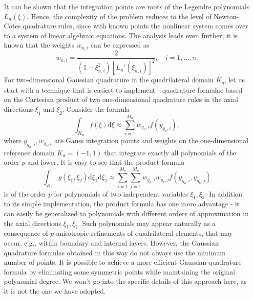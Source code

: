 \documentclass{develop-note}
\begin{document}
It can be shown that the integration points are roots of the Legendre polynomials $L_{n}(\xi)$. Hence, the complexity of the problem reduces to the level of Newton-Cotes quadrature rules, since with known points the nonlinear system comes over to a system of linear algebraic equations. The analysis leads even further; it is known that the weights $w_{n,i}$ can be expressed as
\begin{equation}
  w_{n,i}=\dfrac{2}{(1-\xi_{n,i}^{2})[L_{n}'(\xi_{n,i})]^{2}}, \quad i=1,\dots,n.
\end{equation}
For two-dimensional Gaussian quadrature in the quadrilateral domain $K_{q}$, let us start with a technique that is easiest to implement - quadrature formulae based on the Cartesian product of two one-dimensional quadrature rules in the axial directions $\xi_{1}$ and $\xi_{2}$. Consider the formula
\begin{equation}
  \int_{K_{a}}f(\xi)\mathrm{d}\xi\approx\sum_{i=1}^{M_{a}}w_{g_{a},i}f(y_{g_{a},i}),
\end{equation}
where $y_{g_{a},i},w_{g_{a},i}$ are Gauss integration points and weights on the one-dimensional reference domain $K_{a}=(-1,1)$ that integrate exactly all polynomials of the order $p$ and lower. It is easy to see that the product formula
\begin{equation}
  \int_{K_{a}}g(\xi_{1},\xi_{2})\mathrm{d}\xi_{1}\mathrm{d}\xi_{2}\approx\sum_{i=1}^{M_{a}}\sum_{j=1}^{M_{a}}w_{g_{a},i}w_{g_{b},j}f(y_{g_{a},i},y_{g_{b},j})
\end{equation}
is of the order $p$ for polynomials of two independent variables $\xi_{1},\xi_{2}$. In addition to its simple implementation, the product formula has one more advantage - it can easily be generalized to polynomials with different orders of approximation in the axial directions $\xi_{1},\xi_{2}$. Such polynomials may appear naturally as a consequence of $p$-anisotropic refinements of quadrilateral elements, that may occur, e.g., within boundary and internal layers. However, the Gaussian quadrature formulas obtained in this way do not always use the minimum number of points. It is possible to achieve a more efficient Gaussian quadrature formula by eliminating some symmetric points while maintaining the original polynomial degree. We won't go into the specific details of this approach here, as it is not the one we have adopted.
\end{document}
